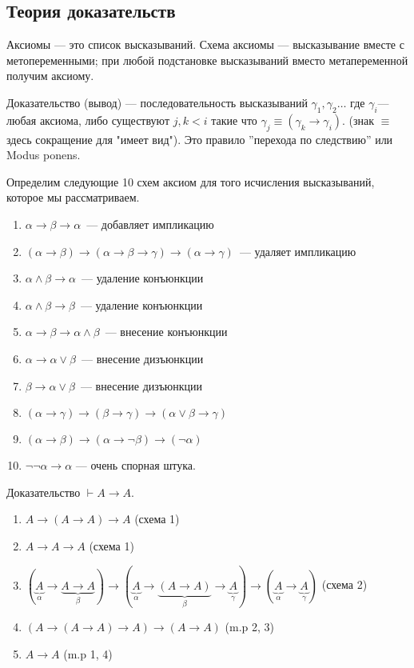 \subsection{Теория доказательств}
\begin{definition}
    Аксиомы --- это список высказываний.
    Схема аксиомы --- высказывание вместе с метопеременными; при любой подстановке высказываний вместо метапеременной получим аксиому. 
\end{definition}

\begin{definition}
    Доказательство (вывод) --- последовательность высказываний $\gamma_1, \gamma_2\ldots$ где $\gamma_i$--- любая аксиома, 
    либо существуют $j,k < i$ такие что $\gamma_j \equiv (\gamma_k \to \gamma_i)$.
    (знак $\equiv$ здесь сокращение для "имеет вид"). Это правило ''перехода по следствию'' или Modus ponens.
\end{definition}

Определим следующие 10 схем аксиом для того исчисления высказываний, которое мы рассматриваем. 
\begin{enumerate}
    \item $\alpha \to \beta \to \alpha$~--- добавляет импликацию
    \item $(\alpha \to \beta) \to (\alpha \to \beta \to \gamma) \to (\alpha \to \gamma)$~--- удаляет импликацию
    \item $\alpha \land \beta \to \alpha$~--- удаление конъюнкции
    \item $\alpha \land \beta \to \beta$~--- удаление конъюнкции
    \item $\alpha \to \beta \to \alpha \land \beta$~--- внесение конъюнкции
    \item $\alpha \to \alpha \lor \beta$~--- внесение дизъюнкции
    \item $\beta \to \alpha \lor \beta$~--- внесение дизъюнкции
    \item $(\alpha \to \gamma) \to (\beta \to \gamma) \to (\alpha \lor \beta \to \gamma)$
    \item $(\alpha \to \beta) \to (\alpha \to \neg \beta) \to (\neg \alpha)$
    \item $\neg \neg \alpha \to \alpha$ --- очень спорная штука.
\end{enumerate}

\begin{example} Доказательство
    $\vdash A \to A $.
    \begin{enumerate}
        \item $A \to (A \to A) \to A$ (схема 1)
        \item $A \to A \to A$  (схема 1)
        \item $(\underbrace{A}_\alpha \to \underbrace{A \to A}_\beta) \to (\underbrace{A}_\alpha \to \underbrace{(A \to A)}_\beta \to \underbrace{A}_\gamma) \to (\underbrace{A}_\alpha \to \underbrace{A}_\gamma)$  (схема 2)
        \item $(A \to (A \to A) \to A) \to (A \to A)$ (m.p 2, 3)
        \item $A \to A$ (m.p 1, 4)
    \end{enumerate}
\end{example}